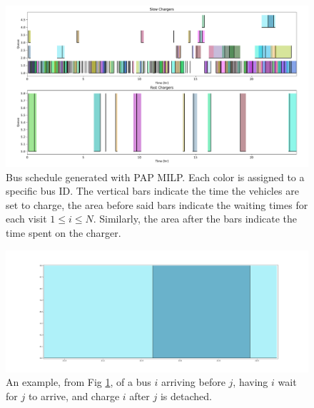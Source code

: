 \documentclass[letterpaper, 10pt, conference]{IEEEtran}
\begin{document}
\begin{figure}[ht]
	\centering
	\includegraphics[trim=1in 0.25in 1in 0.5in, width=\linewidth]{schedule.pdf}
	\caption{Bus schedule generated with PAP MILP. Each color is assigned to a specific bus ID. The vertical bars indicate the time the vehicles are set to charge, the area before said bars indicate the waiting times for each visit $1 \leq i \leq N$. Similarly, the area after the bars indicate the time spent on the charger.}
	\label{fig:schedule}
\end{figure}

\begin{figure}[ht]
	\centering
	\includegraphics[trim=0in 0in 0in 0in, width=\linewidth]{unoptimal.pdf}
	\caption{An example, from Fig \ref{fig:schedule}, of a bus $i$ arriving before $j$, having $i$ wait for $j$ to arrive, and charge $i$ after $j$ is detached.}
	\label{fig:unoptimal}
\end{figure}
\end{document}
